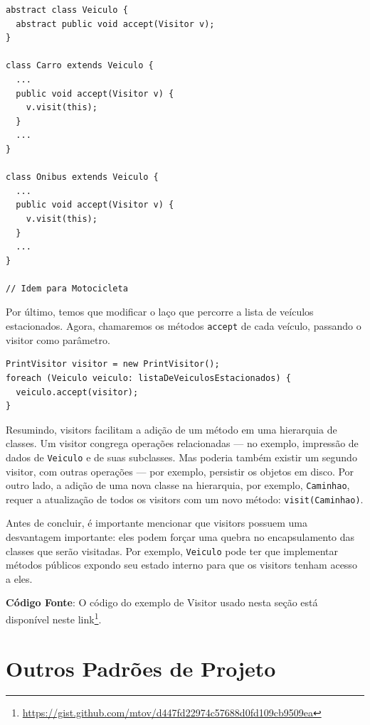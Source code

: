 \documentclass[
  11pt,
  twoside]{book}
\newcommand{\passthrough}[1]{#1}
\DeclareRobustCommand{\href}[2]{#2\footnote{\url{#1}}}
\begin{document}
\begin{lstlisting}
abstract class Veiculo {
  abstract public void accept(Visitor v);
}

class Carro extends Veiculo {
  ...
  public void accept(Visitor v) {
    v.visit(this);
  }
  ...
}

class Onibus extends Veiculo {
  ...
  public void accept(Visitor v) {
    v.visit(this);
  }
  ...
}

// Idem para Motocicleta
\end{lstlisting}

Por último, temos que modificar o laço que percorre a lista de veículos
estacionados. Agora, chamaremos os métodos
\passthrough{\lstinline!accept!} de cada veículo, passando o visitor
como parâmetro.

\begin{lstlisting}
PrintVisitor visitor = new PrintVisitor();
foreach (Veiculo veiculo: listaDeVeiculosEstacionados) {
  veiculo.accept(visitor);
}
\end{lstlisting}

Resumindo, visitors facilitam a adição de um método em uma hierarquia de
classes. Um visitor congrega operações relacionadas --- no exemplo,
impressão de dados de \passthrough{\lstinline!Veiculo!} e de suas
subclasses. Mas poderia também existir um segundo visitor, com outras
operações --- por exemplo, persistir os objetos em disco. Por outro
lado, a adição de uma nova classe na hierarquia, por exemplo,
\passthrough{\lstinline!Caminhao!}, requer a atualização de todos os
visitors com um novo método: \passthrough{\lstinline!visit(Caminhao)!}.

Antes de concluir, é importante mencionar que visitors possuem uma
desvantagem importante: eles podem forçar uma quebra no encapsulamento
das classes que serão visitadas. Por exemplo,
\passthrough{\lstinline!Veiculo!} pode ter que implementar métodos
públicos expondo seu estado interno para que os visitors tenham acesso a
eles.

\textbf{Código Fonte}: O código do exemplo de Visitor usado nesta seção
está disponível neste
\href{https://gist.github.com/mtov/d447fd22974c57688d0fd109cb9509ea}{link}.

\hypertarget{outros-padruxf5es-de-projeto}{%
\section{Outros Padrões de Projeto}\label{outros-padruxf5es-de-projeto}}

 
\end{document}
